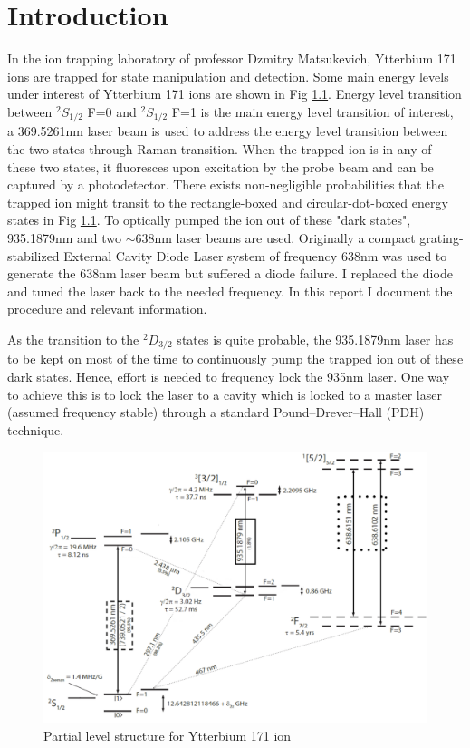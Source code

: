 \documentclass[12pt]{report}
\begin{document}
\chapter{Introduction}
In the ion trapping laboratory of professor Dzmitry Matsukevich, Ytterbium 171 ions are trapped for state manipulation and detection. Some main energy levels under interest of Ytterbium 171 ions are shown in Fig \ref{fig:Yitterbium171Ion}. Energy level transition between  $^2 S_{1/2}$ F=0 and $^2 S_{1/2}$ F=1 is the main energy level transition of interest, a 369.5261nm laser beam is used to address the energy level transition between the two states through Raman transition. When the trapped ion is in any of these two states, it fluoresces upon excitation by the probe beam and can be captured by a photodetector. There exists non-negligible probabilities that the trapped ion might transit to the rectangle-boxed and circular-dot-boxed energy states in Fig \ref{fig:Yitterbium171Ion}. To optically pumped the ion out of these "dark states", 935.1879nm and two $\sim$638nm laser beams are used. Originally a compact grating-stabilized External Cavity Diode Laser system of frequency 638nm was used to generate the 638nm laser beam but suffered a diode failure. I replaced the diode and tuned the laser back to the needed frequency. In this report I document the procedure and relevant information. 
\par
As the transition to the $^2 D_{3/2}$ states is quite probable, the 935.1879nm laser has to be kept on most of the time to continuously pump the trapped ion out of these dark states. Hence, effort is needed to frequency lock the 935nm laser. One way to achieve this is to lock the laser to a cavity which is locked to a master laser (assumed frequency stable) through a standard Pound–Drever–Hall (PDH) technique. 

\begin{figure}[H]
    \centering
    \includegraphics[width=\textwidth]{Yitterbium171Ion.png}
    \caption{Partial level structure for Ytterbium 171 ion \cite{DemonstrationOfRabi-FlopsWithYtterbium171Trapped-IonQubits}
    }
    \label{fig:Yitterbium171Ion}
\end{figure}
\end{document}
